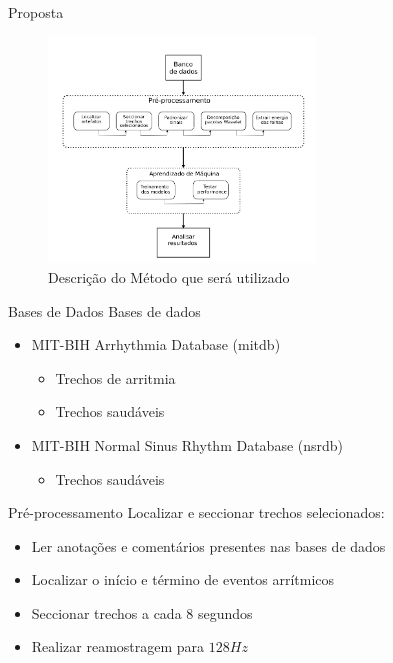 \documentclass[10pt]{beamer}
\begin{document}
\begin{frame}{Proposta}
  \begin{figure}[]
    \centering
    \includegraphics[height=6cm]{images/proposal.png}
    \caption{Descrição do Método que será utilizado}
  \end{figure}
\end{frame}

\begin{frame}{Bases de Dados}
  Bases de dados
  \begin{itemize}
    \item MIT-BIH Arrhythmia Database (mitdb)
    \begin{itemize}
      \item Trechos de arritmia
      \item Trechos saudáveis 
    \end{itemize}

    \item MIT-BIH Normal Sinus Rhythm Database (nsrdb)
    \begin{itemize}
      \item Trechos saudáveis
    \end{itemize}
  \end{itemize}
\end{frame}

\begin{frame}{Pré-processamento}
  Localizar e seccionar trechos selecionados:
  \begin{itemize}
    \item Ler anotações e comentários presentes nas bases de dados
    \item Localizar o início e término de eventos arrítmicos
    \item Seccionar trechos a cada 8 segundos
    \item Realizar reamostragem para $128 Hz$
  \end{itemize}
\end{frame}
\end{document}

